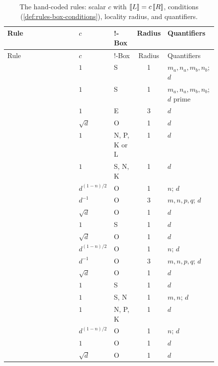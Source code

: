 \begin{xltabular}{\linewidth}{@{}>{\raggedright\arraybackslash}p{0.34\linewidth}>{\raggedright\arraybackslash}p{0.16\linewidth}lc>{\raggedright\arraybackslash}X@{}}
\caption{The hand-coded rules: scalar $c$ with $\sem{L}=c\,\sem{R}$, \bbox{} conditions (\cref{def:rules-box-conditions}), locality radius, and quantifiers.}\label{tab:rules-summary}\\
\toprule
Rule & $c$ & !-Box & Radius & Quantifiers \\
\midrule
\endfirsthead
\toprule
Rule & $c$ & !-Box & Radius & Quantifiers \\
\midrule
\endhead
\bottomrule
\endfoot
{} & $1$ & S & 1 & $m_a,n_a,m_b,n_b$; $d$ \\
 & $1$ & S & 1 & $m_a,n_a,m_b,n_b$; $d$ prime \\
 & $1$ & E & 3 & $d$ \\
 & $\sqrt d$ & O & 1 & $d$ \\
 & $1$ & N, P, K or L & 1 & $d$ \\
 & $1$ & S, N, K & 1 & $d$ \\
 & $d^{(1-n)/2}$ & O & 1 & $n$; $d$ \\
 & $d^{-1}$ & O & 3 & $m,n,p,q$; $d$ \\
 & $\sqrt d$ & O & 1 & $d$ \\
 & $1$ & S & 1 & $d$ \\
 & $\sqrt d$ & O & 1 & $d$ \\
 & $d^{(1-n)/2}$ & O & 1 & $n$; $d$ \\
 & $d^{-1}$ & O & 3 & $m,n,p,q$; $d$ \\
 & $\sqrt d$ & O & 1 & $d$ \\
 & $1$ & S & 1 & $d$ \\
 & $1$ & S, N & 1 & $m,n$; $d$ \\
 & $1$ & N, P, K & 1 & $d$ \\
 & $d^{(1-n)/2}$ & O & 1 & $n$; $d$ \\
 & $1$ & O & 1 & $d$ \\
 & $\sqrt d$ & O & 1 & $d$ \\

\end{xltabular}
